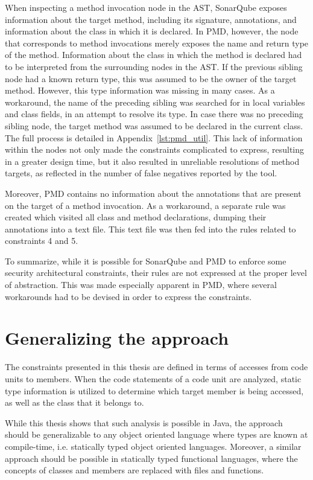 When inspecting a method invocation node in the AST, SonarQube exposes information about the target method, including its signature, annotations, and information about the class in which it is declared. In PMD, however, the node that corresponds to method invocations merely exposes the name and return type of the method. Information about the class in which the method is declared had to be interpreted from the surrounding nodes in the AST. If the previous sibling node had a known return type, this was assumed to be the owner of the target method. However, this type information was missing in many cases. As a workaround, the name of the preceding sibling was searched for in local variables and class fields, in an attempt to resolve its type. In case there was no preceding sibling node, the target method was assumed to be declared in the current class. The full process is detailed in Appendix~\ref{lst:pmd_util}. This lack of information within the nodes not only made the constraints complicated to express, resulting in a greater design time, but it also resulted in unreliable resolutions of method targets, as reflected in the number of false negatives reported by the tool.

Moreover, PMD contains no information about the annotations that are present on the target of a method invocation. As a workaround, a separate rule was created which visited all class and method declarations, dumping their annotations into a text file. This text file was then fed into the rules related to constraints 4 and 5.

To summarize, while it is possible for SonarQube and PMD to enforce some security architectural constraints, their rules are not expressed at the proper level of abstraction. This was made especially apparent in PMD, where several workarounds had to be devised in order to express the constraints.


\section{Generalizing the approach}
The constraints presented in this thesis are defined in terms of accesses from code units to members. When the code statements of a code unit are analyzed, static type information is utilized to determine which target member is being accessed, as well as the class that it belongs to.

While this thesis shows that such analysis is possible in Java, the approach should be generalizable to any object oriented language where types are known at compile-time, i.e. statically typed object oriented languages. %
Moreover, a similar approach should be possible in statically typed functional languages, where the concepts of classes and members are replaced with files and functions.


